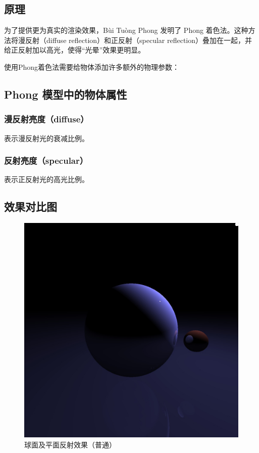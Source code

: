 \documentclass[10pt,twocolumn]{article}
\begin{document}
\subsection{\hei 原理}

为了提供更为真实的渲染效果，Bùi Tuòng Phong 发明了 Phong 着色法。这种方法将漫反射（diffuse reflection）和正反射（specular reflection）叠加在一起，并给正反射加以高光，使得“光晕”效果更明显。

使用Phong着色法需要给物体添加许多额外的物理参数：
\subsection{Phong 模型中的物体属性}
\subsubsection{\hei 漫反射亮度（diffuse）}
表示漫反射光的衰减比例。
\subsubsection{\hei 反射亮度（specular）}
表示正反射光的高光比例。

\subsection{\hei 效果对比图}
\newpage

\begin{figure}[ht]
\centering
\includegraphics[scale=.2]{fig3.jpg}
\caption{球面及平面反射效果（普通）}
\end{figure}
\end{document}

